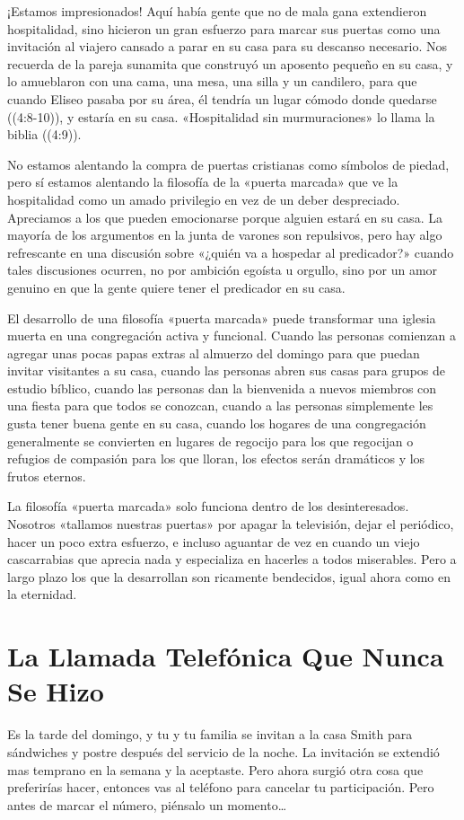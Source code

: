 \documentclass[12pt, twoside, openright]{book}
\begin{document}
¡Estamos impresionados! Aquí había gente que no de mala gana extendieron hospitalidad, sino hicieron un gran esfuerzo para marcar sus puertas como una invitación al viajero cansado a parar en su casa para su descanso necesario. Nos recuerda de la pareja sunamita que construyó un aposento pequeño en su casa, y lo amueblaron con una cama, una mesa, una silla y un candilero, para que cuando Eliseo pasaba por su área, él tendría un lugar cómodo donde quedarse ((4:8-10)), y estaría en su casa. «Hospitalidad sin murmuraciones» lo llama la biblia ((4:9)). 

No estamos alentando la compra de puertas cristianas como símbolos de piedad, pero sí estamos alentando la filosofía de la «puerta marcada» que ve la hospitalidad como un amado privilegio en vez de un deber despreciado. Apreciamos a los que pueden emocionarse porque alguien estará en su casa. La mayoría de los argumentos en la junta de varones son repulsivos, pero hay algo refrescante en una discusión sobre «¿quién va a hospedar al predicador?» cuando tales discusiones ocurren, no por ambición egoísta u orgullo, sino por un amor genuino en que la gente quiere tener el predicador en su casa.
 
El desarrollo de una filosofía «puerta marcada» puede transformar una iglesia muerta en una congregación activa y funcional. Cuando las personas comienzan a agregar unas pocas papas extras al almuerzo del domingo para que puedan invitar visitantes a su casa, cuando las personas abren sus casas para grupos de estudio bíblico, cuando las personas dan la bienvenida a nuevos miembros con una fiesta para que todos se conozcan, cuando a las personas simplemente les gusta tener buena gente en su casa, cuando los hogares de una congregación generalmente se convierten en lugares de regocijo para los que regocijan o refugios de compasión para los que lloran, los efectos serán dramáticos y los frutos eternos.

La filosofía «puerta marcada» solo funciona dentro de los desinteresados. Nosotros «tallamos nuestras puertas» por apagar la televisión, dejar el periódico, hacer un poco extra esfuerzo, e incluso aguantar de vez en cuando un viejo cascarrabias que aprecia nada y especializa en hacerles a todos miserables. Pero a largo plazo los que la desarrollan son ricamente bendecidos, igual ahora como en la eternidad. 

\section{La Llamada Telefónica Que Nunca Se Hizo}
Es la tarde del domingo, y tu y tu familia se invitan a la casa Smith para sándwiches y postre después del servicio de la noche. La invitación se extendió mas temprano en la semana y la aceptaste. Pero ahora surgió otra cosa que preferirías hacer, entonces vas al teléfono para cancelar tu participación. Pero antes de marcar el número, piénsalo un momento\ldots
\end{document}
